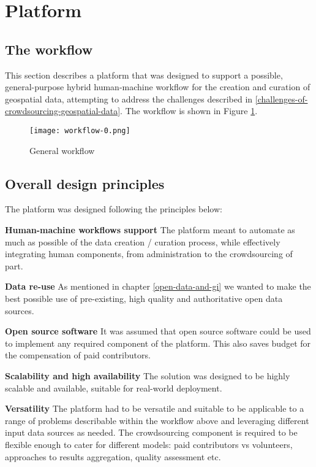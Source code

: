 \section{Platform}

\subsection{The workflow}

This section describes a platform that was designed to support a possible, general-purpose hybrid human-machine workflow for the creation and curation of geospatial data, attempting to address the challenges described in \ref{challenges-of-crowdsourcing-geospatial-data}. The workflow is shown in Figure \ref{fig:workflow_0}.

\begin{figure}
	\texttt{[image: workflow-0.png]}
	\caption{General workflow}
	\label{fig:workflow_0}
\end{figure}

\subsection{Overall design principles}

The platform was designed following the principles below:

\textbf{Human-machine workflows support} The platform meant to automate as much as possible of the data creation / curation process, while effectively integrating human components, from administration to the crowdsourcing of part.

\textbf{Data re-use} As mentioned in chapter \ref{open-data-and-gi} we wanted to make the best possible use of pre-existing, high quality and authoritative open data sources.

\textbf{Open source software} It was assumed that open source software could be used to implement any required component of the platform. This also saves budget for the compensation of paid contributors.

\textbf{Scalability and high availability} The solution was designed to be highly scalable and available, suitable for real-world deployment.

\textbf{Versatility} The platform had to be versatile and suitable to be applicable to a range of problems describable within the workflow above and leveraging different input data sources as needed. The crowdsourcing component is required to be flexible enough to cater for different models: paid contributors vs volunteers, approaches to results aggregation, quality assessment etc.

